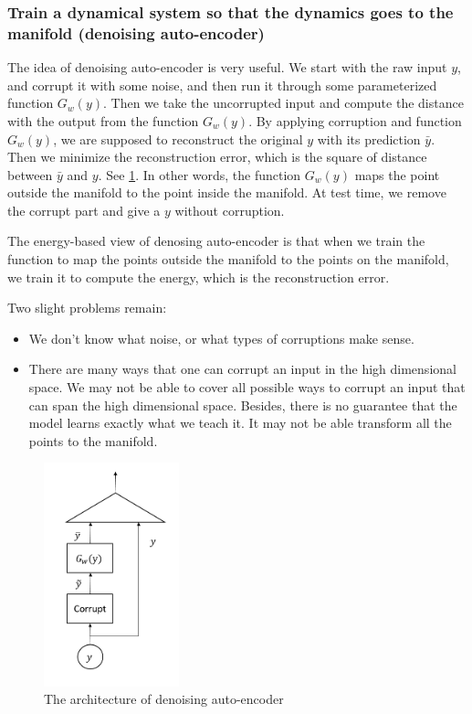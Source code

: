 \subsubsection{Train a dynamical system so that the dynamics goes to the manifold (denoising auto-encoder)}

The idea of denoising auto-encoder is very useful. 
We start with the raw input $y$, and corrupt it with some noise, and then run it through some parameterized function $G_w(y)$. 
Then we take the uncorrupted input and compute the distance with the output from the function $G_w(y)$. 
By applying corruption and function $G_w(y)$, we are supposed to reconstruct the original $y$ with its prediction $\bar y$. 
Then we minimize the reconstruction error, which is the square of distance between $\bar y$ and $y$.
See \ref{figure6}. 
In other words, the function $G_w(y)$ maps the point outside the manifold to the point inside the manifold. 
At test time, we remove the corrupt part and give a $y$ without corruption. 

The energy-based view of denosing auto-encoder is that when we train the function to map the points outside the manifold to the points on the manifold, we train it to compute the energy, which is the reconstruction error.

Two slight problems remain:

\begin{itemize}
    \item We don't know what noise, or what types of corruptions make sense.
    \item There are many ways that one can corrupt an input in the high dimensional space.
    We may not be able to cover all possible ways to corrupt an input that can span the high dimensional space. 
    Besides, there is no guarantee that the model learns exactly what we teach it. It may not be able transform all the points to the manifold.
\end{itemize}

\begin{figure}[htb]
    \centering
    \includegraphics[width=0.35\textwidth]{lectures/10-b/image/PIC6.PNG}
    \caption{The architecture of denoising auto-encoder}
    \label{figure6}
\end{figure}


